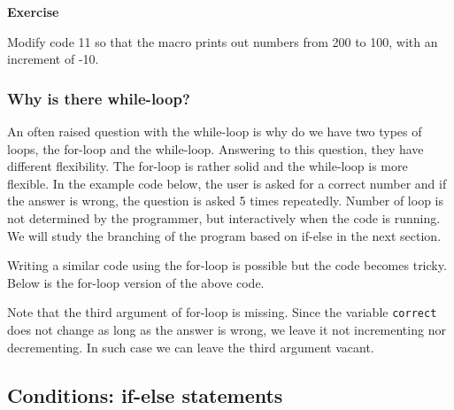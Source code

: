 \documentclass[11pt,a4paper,oneside]{report}
\newenvironment{indentexercise}[1]%
{{\setlength{\leftmargin}{2em}}%
\textbf{Exercise \thesubsection-#1}%
\begin{list}{}%
	\item%
}
{\end{list}}
\newcommand{\ilcom}[1]{\texttt{\small#1}}
\begin{document}
\begin{indentexercise}{3}
Modify code 11 so that the macro prints out numbers from 200 to 100, with an increment of -10. 
\end{indentexercise}

\subsubsection{Why is there while-loop?}

An often raised question with the while-loop is why do we have two types of loops, 
the for-loop and the while-loop. Answering to this question, they have different
flexibility. The for-loop is rather solid and the while-loop is more flexible. In the
example code below, the user is asked for a correct number and if the answer is wrong, the
question is asked 5 times repeatedly. Number of loop is not determined by the
programmer, but interactively when the code is running. We will study
the branching of the program based on if-else in the next section.  



Writing a similar code using the for-loop is possible but the code becomes tricky.
Below is the for-loop version of the above code.  



Note that the third argument of for-loop is missing. Since the variable
\ilcom{correct} does not change as long as the answer is wrong, we leave it not
incrementing nor decrementing. In such case we can leave the third argument
vacant. 

\subsection{Conditions: if-else statements}
\end{document}
